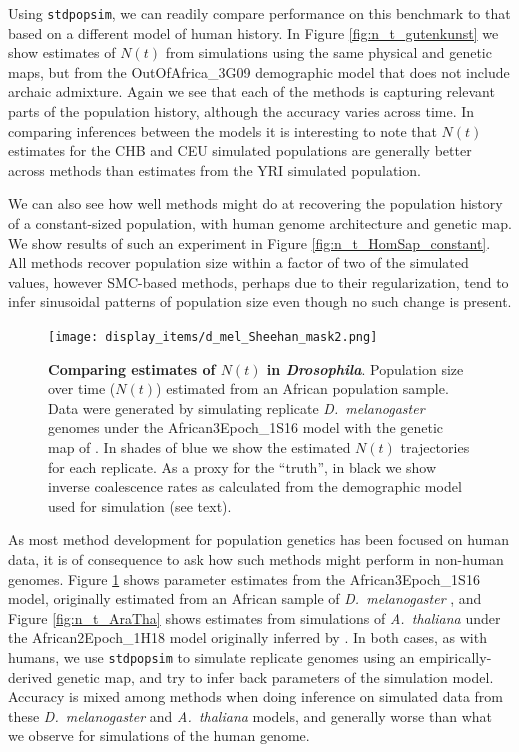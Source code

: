 \documentclass[12pt,halfline,a4paper]{ouparticle}
\newcommand{\stdpopsim}{\texttt{stdpopsim}\xspace}
\begin{document}
Using \stdpopsim, we can readily compare performance on this benchmark to
that based on a different model of human history. In Figure \ref{fig:n_t_gutenkunst} we show estimates of
$N(t)$ from simulations using the same physical and genetic maps, but from the OutOfAfrica\_3G09
demographic model that does not include archaic admixture. Again we see that each
of the methods is capturing relevant parts of the population history, although the
accuracy varies across time. In comparing inferences between the
models it is interesting to note that $N(t)$ estimates for the CHB and CEU
simulated populations are generally better across methods than estimates from the YRI
simulated population.

We can also
see how well methods might do at recovering the population history of a constant-sized population,
with human genome architecture and genetic map.
We show results of such an
experiment in Figure \ref{fig:n_t_HomSap_constant}.
All methods recover population size within a factor of two of the simulated values, however
SMC-based methods, perhaps due to their regularization, tend to infer sinusoidal
patterns of population size even though no such change is present.


\begin{figure}
\begin{center}
\texttt{[image: display\_items/d\_mel\_Sheehan\_mask2.png]}
\caption{\textbf{Comparing estimates of $N(t)$ in \textit{Drosophila}}. Population
size over time ($N(t)$) estimated from an African population sample. Data were generated by simulating
replicate \textit{D.~melanogaster} genomes under the African3Epoch\_1S16 model \citep{sheehan2016deep}
with the genetic map of \cite{comeron2012many}. In shades of blue we show the estimated
$N(t)$ trajectories for each replicate.
As a proxy for the ``truth'', in black we show inverse coalescence rates
as calculated from the demographic model used for simulation (see text).
}
\label{fig:n_t_sheehan}
\end{center}
\end{figure}

As most method development for population genetics has been focused on human
data, it is of consequence to ask how such methods might perform in non-human
genomes. Figure \ref{fig:n_t_sheehan} shows parameter estimates from the African3Epoch\_1S16
model, originally estimated from an African sample of \textit{D.~melanogaster} \citep{sheehan2016deep},
and Figure \ref{fig:n_t_AraTha} shows estimates from simulations of \textit{A.~thaliana}
under the African2Epoch\_1H18 model originally inferred by \cite{huber2018gene}.
In both cases, as with humans, we use \stdpopsim to simulate replicate genomes using an empirically-derived genetic map,
and try to infer back parameters of the simulation model.
Accuracy is mixed among methods when doing inference on simulated data from these \textit{D.~melanogaster}
and \textit{A.~thaliana} models, and generally worse than what we
observe for simulations of the human genome.
\end{document}
